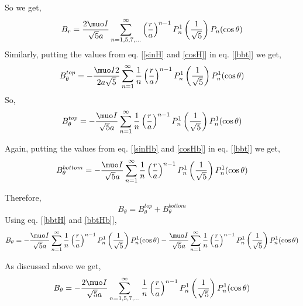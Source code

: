 So we get,
\begin{equation}\label{brtotf}
B_r=\frac{2 \muo I }{\sqrt{5}a}\sum_{n=1,5,7,...}^{\infty} \left(\frac{r}{a}\right)^{n-1}P_n^1\left(\frac{1}{\sqrt{5}}\right) P_n(\cos\theta)
\end{equation}
Similarly, putting the values from eq. [\ref{sinH} and \ref{cosH}] in eq. [\ref{bbt}] we get,
$$B_\theta^{top}=-\frac{\muo I 2}{2a\sqrt{5}}\sum_{n=1}^{\infty} \frac{1}{n}\left(\frac{r}{a}\right)^{n-1}P_n^1\left(\frac{1}{\sqrt{5}}\right) P_n^1(\cos\theta)$$
So,
\begin{equation}\label{bbtH}
B_\theta^{top}=-\frac{\muo I }{\sqrt{5}a}\sum_{n=1}^{\infty}\frac{1}{n} \left(\frac{r}{a}\right)^{n-1}P_n^1\left(\frac{1}{\sqrt{5}}\right) P_n^1(\cos\theta)
\end{equation}

Again, putting the values from eq. [\ref{sinHb} and \ref{cosHb}] in eq. [\ref{bbt}] we get,
\begin{equation}\label{bbtHb}
B_\theta^{bottom}=-\frac{\muo I }{\sqrt{5}a}\sum_{n=1}^{\infty}\frac{1}{n} \left(\frac{r}{a}\right)^{n-1}P_n^1\left(\frac{1}{\sqrt{5}}\right) P_n^1(\cos\theta)
\end{equation}

Therefore,
\begin{equation}\label{bttot}
B_\theta=B_\theta^{top}+B_\theta^{bottom}
\end{equation}
Using eq. [\ref{bbtH} and \ref{bbtHb}],
$$B_\theta=-\frac{\muo I }{\sqrt{5}a}\sum_{n=1}^{\infty}\frac{1}{n} \left(\frac{r}{a}\right)^{n-1}P_n^1\left(\frac{1}{\sqrt{5}}\right) P_n^1(\cos\theta)-\frac{\muo I }{\sqrt{5}a}\sum_{n=1}^{\infty}\frac{1}{n} \left(\frac{r}{a}\right)^{n-1}P_n^1\left(\frac{1}{\sqrt{5}}\right) P_n^1(\cos\theta)$$

As discussed above we get,
\begin{equation}\label{brtotf}
B_\theta=-\frac{2 \muo I }{\sqrt{5}a}\sum_{n=1,5,7,...}^{\infty}
\frac{1}{n}\left(\frac{r}{a}\right)^{n-1}P_n^1\left(\frac{1}{\sqrt{5}}\right) P_n^1(\cos\theta)
\end{equation}



